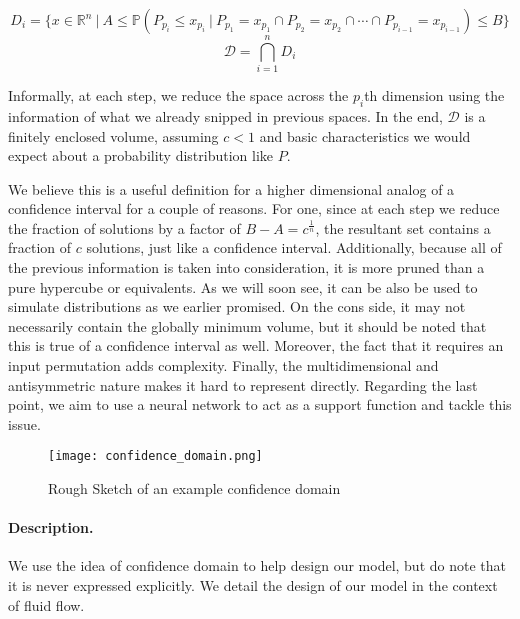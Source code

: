 \documentclass{article}
\begin{document}
    $$D_i = \{ x \in \mathbb{R}^n ~|~ A \le \mathbb{P}(P_{p_i} \le x_{p_i} ~|~ P_{p_1} = x_{p_1} \cap P_{p_2} = x_{p_2} \cap \cdots \cap  P_{p_{i-1}} = x_{p_{i-1}} ) \le B\}$$
    $$\mathcal{D} = \bigcap_{i=1}^{n} D_i$$

    Informally, at each step, we reduce the space across the $p_i$th dimension using the information of what we already snipped in previous spaces. In the end, $\mathcal{D}$ is a finitely enclosed volume, assuming $c < 1$ and basic characteristics we would expect about a probability distribution like $P$.

    We believe this is a useful definition for a higher dimensional analog of a confidence interval for a couple of reasons. For one, since at each step we reduce the fraction of solutions by a factor of $B - A = c ^ \frac{1}{n}$, the resultant set contains a fraction of $c$ solutions, just like a confidence interval. Additionally, because all of the previous information is taken into consideration, it is more pruned than a pure hypercube or equivalents. As we will soon see, it can be also be used to simulate distributions as we earlier promised. On the cons side, it may not necessarily contain the globally minimum volume, but it should be noted that this is true of a confidence interval as well. Moreover, the fact that it requires an input permutation adds complexity. Finally, the multidimensional and antisymmetric nature makes it hard to represent directly. Regarding the last point, we aim to use a neural network to act as a support function and tackle this issue.

    \begin{figure}
        \centering
        \caption{Rough Sketch of an example confidence domain}
        \texttt{[image: confidence\_domain.png]}
    \end{figure}

    \newpage

    \paragraph{Description.}
    We use the idea of confidence domain to help design our model, but do note that it is never expressed explicitly. We detail the design of our model in the context of fluid flow.
\end{document}
